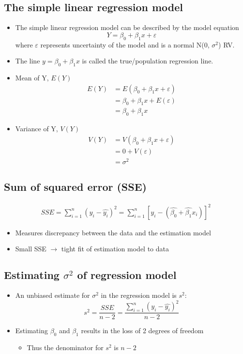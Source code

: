 \documentclass[a4paper]{article}
\begin{document}
\subsection{The simple linear regression model}
\begin{itemize}
    \item The simple linear regression model can be described by the model equation
    $$ Y = \beta_{0} + \beta_{1}x + \varepsilon$$
    where $\varepsilon$ represents uncertainty of the model and is a normal N(0, $\sigma^2$) RV.
    \item The line $y = \beta_{0} + \beta_{1}x$ is called the true/population regression line.
    \item Mean of Y, $E(Y)$
    \begin{align*}
        E(Y) &= E(\beta_{0} + \beta_{1}x + \varepsilon)\\
        &= \beta_{0} + \beta_{1}x + E(\varepsilon)\\
        &= \beta_{0} + \beta_{1}x
    \end{align*}
    \item Variance of Y, $V(Y)$
    \begin{align*}
        V(Y) &= V(\beta_{0} + \beta_{1}x + \varepsilon)\\
        &= 0 + V(\varepsilon)\\
        &= \sigma^2
    \end{align*}
\end{itemize}
\newpage
\subsection{Sum of squared error (SSE)}
\begin{align*}
    SSE = \sum_{i=1}^{n}(y_{i}-\hat{y_{i}})^{2} = \sum_{i=1}^{n}\left[y_{i}-(\hat{\beta_{0}}+\hat{\beta_{1}}x_{i})\right]^{2}
\end{align*}
\begin{itemize}
    \item Measures discrepancy between the data and the estimation model
    \item Small SSE $\rightarrow{}$ tight fit of estimation model to data
\end{itemize}
\subsection{Estimating \texorpdfstring{$\sigma^2$}{variance} of regression model}
\begin{itemize}
    \item An unbiased estimate for $\sigma^2$ in the regression model is $s^2$:
    $$
    s^2 = \frac{SSE}{n-2} = \frac{\sum_{i=1}^{n}(y_{i}-\hat{y_{i}})^{2}}{n-2}
    $$
    \item Estimating $\beta_{0}$ and $\beta_{1}$ results in the loss of 2 degrees of freedom
    \begin{itemize}[label=$\circ$]
        \item Thus the denominator for $s^2$ is $n-2$
    \end{itemize}
\end{itemize}
\end{document}
